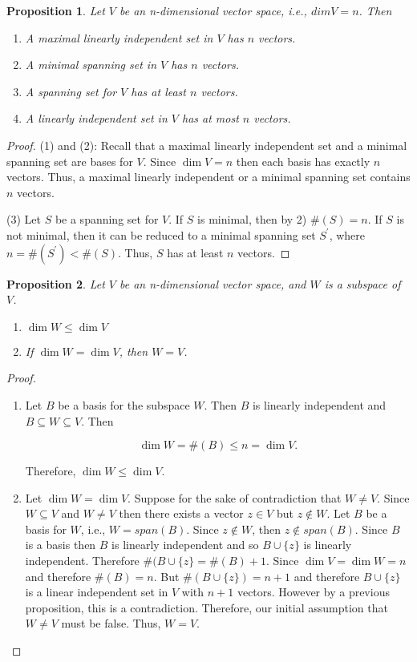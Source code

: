 \documentclass[12pt]{article}
\newtheorem*{proposition}{Proposition}
\theoremstyle{definition}
\begin{document}
\begin{proposition}
Let $V$ be an n-dimensional vector space, i.e., $dim V = n$. Then
\begin{enumerate}[label = (\arabic*)]
\item A maximal linearly independent set in $V$ has $n$ vectors.
\item A minimal spanning set in $V$ has $n$ vectors.
\item A spanning set for $V$ has at least $n$ vectors.
\item A linearly independent set in $V$ has at most $n$ vectors.
\end{enumerate}
\end{proposition}

\begin{proof}
(1) and (2): Recall that a maximal linearly independent set and a minimal spanning set
are bases for $V$. Since $\dim V = n$ then each basis has exactly $n$ vectors. Thus,
a maximal linearly independent or a minimal spanning set contains $n$ vectors.

(3) Let $S$ be a spanning set for $V$. If $S$ is minimal, then by 2) $\#(S) = n$. If $S$
is not minimal, then it can be reduced to a minimal spanning set $S^{\prime}$, where
$n = \# (S^{\prime}) < \# (S)$. Thus, $S$ has at least $n$ vectors.
\end{proof}

\begin{proposition}
Let $V$ be an n-dimensional vector space, and $W$ is a subspace of $V$.
\begin{enumerate}[label = (\arabic*)]
\item $\dim W \leq \dim V$
\item If $\dim W = \dim V$, then $W = V$.
\end{enumerate}
\end{proposition}

\begin{proof}
\begin{enumerate}[label = (\arabic*)]
\item Let $B$ be a basis for the subspace $W$. Then $B$ is linearly independent and
$B \subseteq W \subseteq V$. Then

\[\dim W = \#(B) \leq n = \dim V. \]

Therefore, $\dim W \leq \dim V$.

\item Let $\dim W = \dim V$. Suppose for the sake of contradiction that $W \neq V$.
Since $W \subseteq V$ and $W \neq V$ then there exists a vector $z \in V$ but
$z \notin W$. Let $B$ be a basis for $W$, i.e., $W = span(B)$. Since $z \notin W$,
then $z \notin span(B)$. Since $B$ is a basis then $B$ is linearly independent and
so $B \cup \{z\}$ is linearly independent. Therefore $\#(B \cup \{ z \} = \#(B) + 1$.
Since $\dim V = \dim W = n$ and therefore $\#(B) = n$. But $\#(B \cup \{ z \}) = n + 1$
and therefore $B \cup \{ z \}$ is a linear independent set in $V$ with $n + 1$ vectors.
However by a previous proposition, this is a contradiction. Therefore, our initial
assumption that $W \neq V$ must be false. Thus, $W = V$.
\end{enumerate}
\end{proof}
\end{document}
